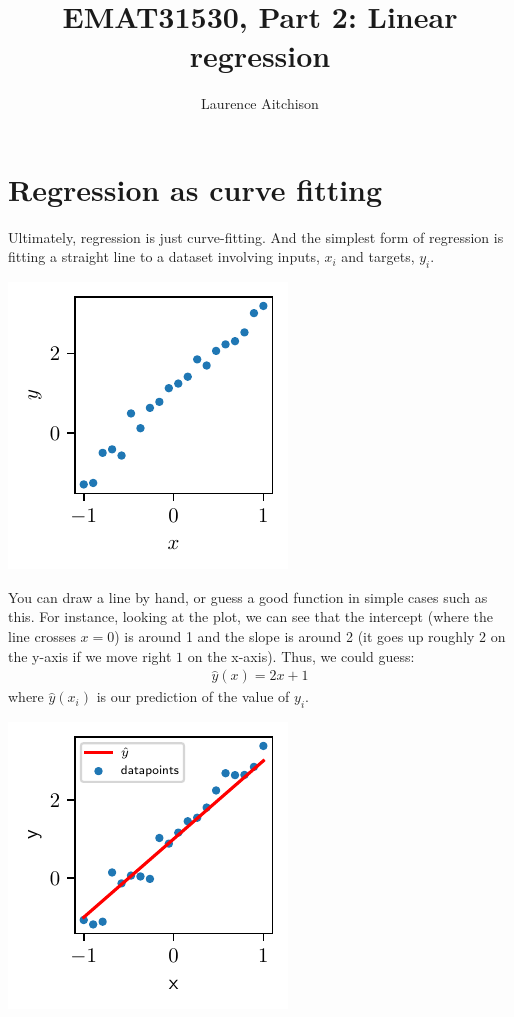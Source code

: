 \documentclass{article}
\title{EMAT31530, Part 2: Linear regression}
\author{Laurence Aitchison}
\date{}
\begin{document}
\maketitle

\section{Regression as curve fitting}
Ultimately, regression is just curve-fitting.
And the simplest form of regression is fitting a straight line to a dataset involving inputs, $x_i$ and targets, $y_i$.
\begin{center}
  \includegraphics{scatter.pdf}
\end{center}
You can draw a line by hand, or guess a good function in simple cases such as this.
For instance, looking at the plot, we can see that the intercept (where the line crosses $x=0$) is around 1 and the slope is around 2 (it goes up roughly $2$ on the y-axis if we move right $1$ on the x-axis).
Thus, we could guess:
\begin{align}
  \hat{y}(x) = 2 x + 1
\end{align}
where $\hat{y}(x_i)$ is our prediction of the value of $y_i$.
\begin{center}
  \includegraphics{guess.pdf}
\end{center}
\end{document}
